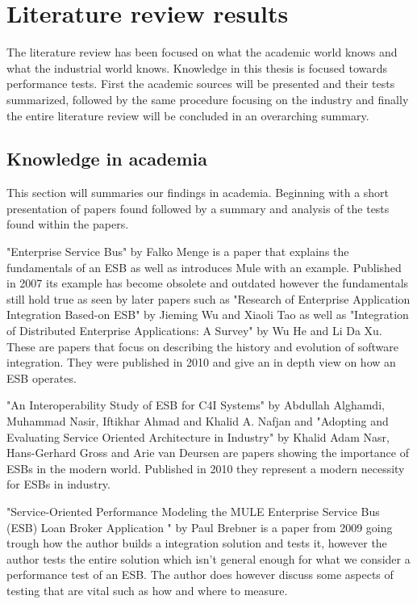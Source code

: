 ﻿\section{Literature review results}
\label{sec:litrev}

The literature review has been focused on what the academic world knows and what the industrial world knows. Knowledge in this thesis is focused towards performance tests.
First the academic sources will be presented and their tests summarized, followed by the same procedure focusing on the industry and finally the entire literature review will be concluded in an overarching summary.

\subsection{Knowledge in academia}
\label{sec:academia_section}
This section will summaries our findings in academia. Beginning with a short presentation of papers found followed by a summary and analysis of the tests found within the papers.


"Enterprise Service Bus"\cite{falko07} by Falko Menge is a paper that explains the fundamentals of an ESB as well as introduces Mule with an example. Published in 2007 its example has become obsolete and outdated however the fundamentals still hold true as seen by later papers such as "Research of Enterprise Application Integration Based-on ESB" \cite{Jieming2010} by Jieming Wu and Xiaoli Tao as well as "Integration of Distributed Enterprise Applications: A Survey" \cite{HeIntegration} by Wu He and Li Da Xu. These are papers that focus on describing the history and evolution of software integration. They were published in 2010 and give an in depth view on how an ESB  operates.


"An Interoperability  Study  of ESB for C4I  Systems" \cite{Alghamdi2010} by Abdullah Alghamdi, Muhammad Nasir, Iftikhar Ahmad and Khalid A. Nafjan and  "Adopting and Evaluating Service Oriented Architecture in Industry" by Khalid Adam Nasr, Hans-Gerhard Gross and Arie van Deursen are papers showing the importance of ESBs in the modern world. Published in 2010 they represent a modern necessity for ESBs in industry.


"Service-Oriented Performance Modeling the MULE Enterprise Service Bus (ESB) Loan Broker Application " \cite{Brebner2009} by Paul Brebner is a paper from 2009 going trough how the author builds a integration solution and tests it, however the author tests the entire solution which isn't general enough for what we consider a performance test of an ESB. The author does however discuss some aspects of testing that are vital such as how and where to measure.

